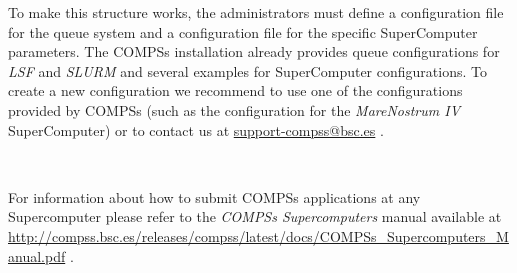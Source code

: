To make this structure works, the administrators must define a configuration file for the queue system and a configuration file
for the specific SuperComputer parameters. The COMPSs installation already provides queue configurations for \textit{LSF} and 
\textit{SLURM} and several examples for SuperComputer configurations. 
To create a new configuration we recommend to use one of the configurations provided by COMPSs (such as the configuration for the
\textit{MareNostrum IV} SuperComputer) or to contact us at \url{support-compss@bsc.es} .

~\newline

For information about how to submit COMPSs applications at any Supercomputer please refer to the \textit{COMPSs Supercomputers} manual 
available at \url{http://compss.bsc.es/releases/compss/latest/docs/COMPSs_Supercomputers_Manual.pdf} .

